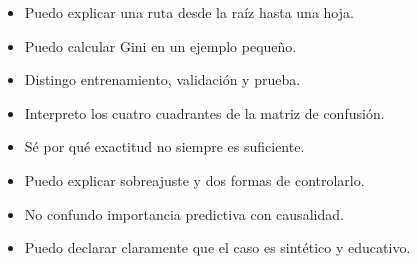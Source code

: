 \documentclass[11pt,oneside,openany]{book}
\begin{document}
\begin{itemize}
  \item[$\square$] Puedo explicar una ruta desde la raíz hasta una hoja.
  \item[$\square$] Puedo calcular Gini en un ejemplo pequeño.
  \item[$\square$] Distingo entrenamiento, validación y prueba.
  \item[$\square$] Interpreto los cuatro cuadrantes de la matriz de confusión.
  \item[$\square$] Sé por qué exactitud no siempre es suficiente.
  \item[$\square$] Puedo explicar sobreajuste y dos formas de controlarlo.
  \item[$\square$] No confundo importancia predictiva con causalidad.
  \item[$\square$] Puedo declarar claramente que el caso es sintético y educativo.
\end{itemize}
\end{document}
